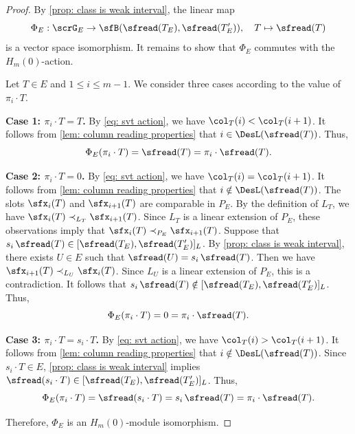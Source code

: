 \documentclass[12pt, reqno]{amsart}
\numberwithin{equation}{section}
\numberwithin{figure}{section}
\numberwithin{table}{section}
\theoremstyle{definition}
\begin{document}
\begin{proof}
By \cref{prop: class is weak interval}, the linear map
\[
\Phi_E:\scrG_E\rightarrow\sfB(\sfread(T_E),\sfread(T'_E)),
\quad
T\mapsto \sfread(T)
\]
is a vector space isomorphism.
It remains to show that $\Phi_E$ commutes with the $H_m(0)$-action.


Let $T \in E$ and $1 \le i \le m-1$.
We consider three cases according to the value of $\pi_i \cdot T$.
\medskip

\noindent
{\bf Case 1: $\pi_i \cdot T=T$.}
By \cref{eq: svt action}, we have $\col_T(i)<\col_T(i+1)$.
It follows from \cref{lem: column reading properties} that $i \in \DesL(\sfread(T))$.
Thus,
\[
\Phi_E(\pi_i \cdot T)=\sfread(T)=\pi_i \cdot \sfread(T).
\]

\noindent
{\bf Case 2: $\pi_i \cdot T=0$.}
By \cref{eq: svt action}, we have $\col_T(i)=\col_T(i+1)$.
It follows from \cref{lem: column reading properties} that $i \notin \DesL(\sfread(T))$.
The slots $\sfx_i(T)$ and $\sfx_{i+1}(T)$ are comparable in $P_E$.
By the definition of $L_T$, we have $\sfx_i(T)\prec_{L_T}\sfx_{i+1}(T)$.
Since $L_T$ is a linear extension of $P_E$, these observations imply that $\sfx_i(T)\prec_{P_E}\sfx_{i+1}(T)$.
Suppose that $s_i \, \sfread(T) \in [\sfread(T_E),\sfread(T'_E)]_L$.
By \cref{prop: class is weak interval}, there exists $U \in E$ such that $\sfread(U)=s_i \, \sfread(T)$.
Then we have $\sfx_{i+1}(T)\prec_{L_U}\sfx_i(T)$.
Since $L_U$ is a linear extension of $P_E$, this is a contradiction.
It follows that $s_i \, \sfread(T)\notin[\sfread(T_E),\sfread(T'_E)]_L$.
Thus,
\[
\Phi_E(\pi_i \cdot T)=0=\pi_i \cdot \sfread(T).
\]

\noindent
{\bf Case 3: $\pi_i \cdot T = s_i \cdot T$.}
By \cref{eq: svt action}, we have $\col_T(i)>\col_T(i+1)$.
It follows from \cref{lem: column reading properties} that $i \notin \DesL(\sfread(T))$.
Since $s_i \cdot T \in E$, \cref{prop: class is weak interval} implies $
\sfread(s_i \cdot T)\in[\sfread(T_E),\sfread(T'_E)]_L$.
Thus,
\[
\Phi_E(\pi_i \cdot T)
=\sfread(s_i \cdot T)
=s_i \, \sfread(T)
=\pi_i \cdot \sfread(T).
\]

Therefore, $\Phi_E$ is an $H_m(0)$-module isomorphism.
\end{proof}
\end{document}
